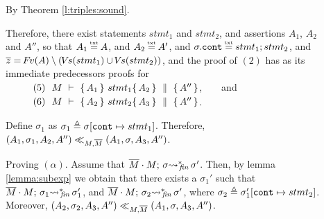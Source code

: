 \begin{description} 
 
 \item[{}] 
 
 By Theorem \ref{l:triples:sound}.

\newcommand{\SPS}{\strut \ \ \hspace{0.5cm} \ \ }
 
\item[{}] 
Therefore, there exist statements $stmt_1$ and $stmt_2$, and assertions  $A_1$, $A_2$ and $A''$, so that $A_1\txteq A$, and $A_2 \txteq A'$, and $\sigma.\prg{cont}\txteq  stmt_1; stmt_2$, and $\overline z = {\hspace{-1pt}F\hspace{-1pt}}v(A) \setminus ({\hspace{-1pt}V\hspace{-1pt}}s(stmt_1) \cup {\hspace{-1pt}V\hspace{-1pt}}s(stmt_2))$, and
the proof of  $(2)$ %
has as its immediate predecessors proofs for \\
$\SPS (5)\ \ M\ \vdash\  \quadruple {A_1} {stmt_1} {A_2} {A''}$,\ \ \ \  and\\
$\SPS (6)\ \  M\ \vdash\  \quadruple {A_2} {stmt_2} {A_3} {A''}$.

Define $\sigma_1$ as  $\sigma_1 \triangleq \sigma[\mbox{\normalfont{\texttt{cont}}} \mapsto stmt_1]$.
Therefore,  $(A_1,\sigma_1,A_2, A'') \ll_{M,\overline{M}} (A_1,\sigma,A_3, A'')$. 

\vspace{.1cm}
Proving $(\alpha)$. Assume that $\overline{M}\cdot M;\, {\sigma} {\rightsquigarrow^*}\!\!_{\mathit{fin}}\, \sigma'$. Then, by lemma \ref{lemma:subexp} we obtain that there exists a $\sigma_1'$ such that $\overline{M}\cdot M;\, {\sigma_1} {\rightsquigarrow^*}\!\!_{\mathit{fin}}\, \sigma_1'$,
and $\overline{M}\cdot M;\, {\sigma_2} {\rightsquigarrow^*}\!\!_{\mathit{fin}}\, \sigma'$, where $\sigma_2 \triangleq \sigma_1'[\mbox{\normalfont{\texttt{cont}}} \mapsto stmt_2]$. Moreover,  $(A_2,\sigma_2,A_3,A'') \ll_{M,\overline{M}} (A_1,\sigma,A_3, A'')$.


\end{description}
